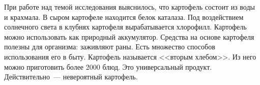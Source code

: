  При работе над темой исследования выяснилось, что картофель состоит из воды и крахмала. В сыром картофеле находится белок каталаза. Под воздействием солнечного света в клубнях картофеля вырабатывается хлорофилл. Картофель можно использовать как природный  аккумулятор. Средства на основе картофеля полезны для организма: заживляют раны. Есть множество способов использования его в быту. Картофель называется <<вторым хлебом>>. Из него можно приготовить более 2000 блюд. Это универсальный продукт. Действительно~--- невероятный картофель.
